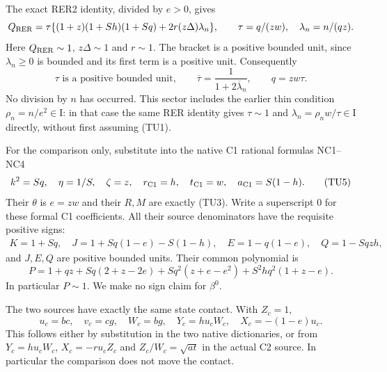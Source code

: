 The exact RER2 identity, divided by $e>0$, gives
\[
 Q_{\rm RER}
 =\tau\{(1+z)(1+Sh)(1+Sq)+2r(z\Delta)\lambda_n\},
 \qquad \tau=q/(zw),\quad \lambda_n=n/(qz).
\]
Here $Q_{\rm RER}\sim1$, $z\Delta\sim1$ and $r\sim1$.
The bracket is a positive bounded unit, since $\lambda_n\geq0$
is bounded and its first term is a positive unit.  Consequently
\[
 \tau\text{ is a positive bounded unit},\qquad
 \overline\tau=\frac1{1+2\overline\lambda_n},\qquad
 q=zw\tau.
                                                               \tag{TU4}
\]
No division by $n$ has occurred.  This sector includes the earlier
thin condition $\rho_n=n/e^2\in\mathrm I$: in that case the same
RER identity gives $\tau\sim1$ and
$\lambda_n=\rho_nw/\tau\in\mathrm I$ directly, without first
assuming (TU1).

For the comparison only, substitute into the native C1 rational
formulas NC1--NC4
\[
 k^2=Sq,\quad \eta=1/S,\quad \zeta=z,\quad
 r_{\rm C1}=h,\quad t_{\rm C1}=w,\quad
 a_{\rm C1}=S(1-h).                                     \tag{TU5}
\]
Their $\theta$ is $e=zw$ and their $R,M$ are exactly (TU3).
Write a superscript $0$ for these formal C1 coefficients.
All their source denominators have the requisite positive signs:
\[
\begin{gathered}
 K=1+Sq,\quad J=1+Sq(1-e)-S(1-h),\quad
 E=1-q(1-e),\quad Q=1-Sqzh,
\end{gathered}
\]
and $J,E,Q$ are positive bounded units.  Their common polynomial is
\[
 P=1+qz+Sq(2+z-2e)+Sq^2(z+e-e^2)+S^2hq^2(1+z-e).
                                                               \tag{TU6}
\]
In particular $P\sim1$.  We make no sign claim for $\beta^0$.

The two sources have exactly the same state contact.  With $Z_c=1$,
\[
 u_c=bc,\quad v_c=cg,\quad W_c=bg,\quad
 Y_c=hu_cW_c,\quad X_c=-(1-e)u_c.                       \tag{TU7}
\]
This follows either by substitution in the two native dictionaries,
or from $Y_c=hu_cW_c$, $X_c=-ru_cZ_c$ and
$Z_c/W_c=\sqrt{at}$ in the actual C2 source.  In particular
the comparison does not move the contact.

